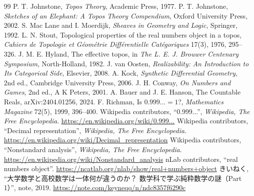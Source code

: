 \documentclass[a4paper,11pt]{ltjsarticle}
\theoremstyle{jpdef}
\theoremstyle{jpthm}
\begin{document}
\begin{thebibliography}{99}
 P. T. Johnstone, \textit{Topos Theory}, Academic Press, 1977.
 P. T. Johnstone, \textit{Sketches of an Elephant: A Topos Theory Compendium}, Oxford University Press, 2002.
 S. Mac Lane and I. Moerdijk, \textit{Sheaves in Geometry and Logic}, Springer, 1992.
 L. N. Stout, Topological properties of the real numbers object in a topos, \textit{Cahiers de Topologie et Géométrie Différentielle Catégoriques} 17(3), 1976, 295--326.
 J. M. E. Hyland, The effective topos, in \textit{The L. E. J. Brouwer Centenary Symposium}, North-Holland, 1982.
 J. van Oosten, \textit{Realizability: An Introduction to Its Categorical Side}, Elsevier, 2008.
 A. Kock, \textit{Synthetic Differential Geometry}, 2nd ed., Cambridge University Press, 2006.
 J. H. Conway, \textit{On Numbers and Games}, 2nd ed., A K Peters, 2001.
 A. Bauer and J. E. Hanson, The Countable Reals, arXiv:2404.01256, 2024.
 F. Richman, Is \(0.999\ldots=1\)?, \textit{Mathematics Magazine} 72(5), 1999, 396--400.
 Wikipedia contributors, ``0.999...'', \textit{Wikipedia, The Free Encyclopedia}. \url{https://en.wikipedia.org/wiki/0.999...}
 Wikipedia contributors, ``Decimal representation'', \textit{Wikipedia, The Free Encyclopedia}. \url{https://en.wikipedia.org/wiki/Decimal_representation}
 Wikipedia contributors, ``Nonstandard analysis'', \textit{Wikipedia, The Free Encyclopedia}. \url{https://en.wikipedia.org/wiki/Nonstandard_analysis}
 nLab contributors, ``real numbers object''. \url{https://ncatlab.org/nlab/show/real+numbers+object}
 きいねく, ``大学数学と高校数学は一体何が違うのか？ 数学科で学ぶ純粋数学の謎（Part 1）'', note, 2019. \url{https://note.com/keyneqq/n/ndc8357f6290c}
\end{thebibliography}
\end{document}
